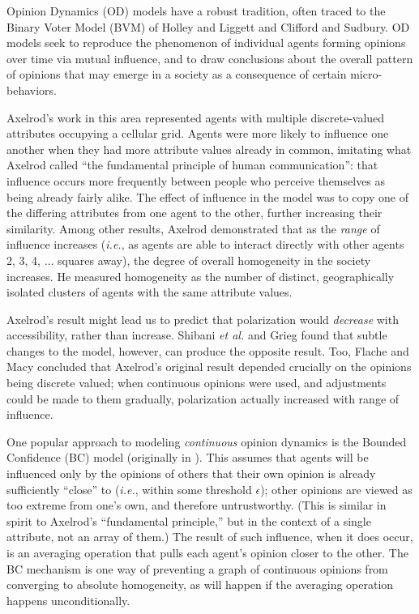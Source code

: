 
\label{sec:related}

Opinion Dynamics (OD) models have a robust tradition, often traced to the
Binary Voter Model (BVM) of Holley and Liggett\cite{holley_ergodic_1975} and
Clifford and Sudbury\cite{clifford_model_1973}. OD models seek to reproduce
the phenomenon of individual agents forming opinions over time via mutual
influence, and to draw conclusions about the overall pattern of opinions that
may emerge in a society as a consequence of certain micro-behaviors.

Axelrod's work in this area\cite{axelrod_dissemination_1997} represented
agents with multiple discrete-valued attributes occupying a cellular grid.
Agents were more likely to influence one another when they had more attribute
values already in common, imitating what Axelrod called ``the fundamental
principle of human communication'': that influence occurs more frequently
between people who perceive themselves as being already fairly alike. The
effect of influence in the model was to copy one of the differing attributes
from one agent to the other, further increasing their similarity. Among other
results, Axelrod demonstrated that as the \textit{range} of influence
increases (\textit{i.e.}, as agents are able to interact directly with other
agents 2, 3, 4, $\dots$ squares away), the degree of overall homogeneity in
the society increases. He measured homogeneity as the number of distinct,
geographically isolated clusters of agents with the same attribute values.

Axelrod's result might lead us to predict that polarization would
\textit{decrease} with accessibility, rather than increase. Shibani \textit{et
al.}\cite{shibanai_effects_2001} and Grieg\cite{greig_end_2002} found that
subtle changes to the model, however, can produce the opposite result. Too,
Flache and Macy\cite{flache_why_2006} concluded that Axelrod's original result
depended crucially on the opinions being discrete valued; when continuous
opinions were used, and adjustments could be made to them gradually,
polarization actually increased with range of influence.

One popular approach to modeling \textit{continuous} opinion dynamics is the
Bounded Confidence (BC) model (originally in
\cite{deffuant_mixing_2000,hegselmann_opinion_2002}). This assumes that agents
will be influenced only by the opinions of others that their own opinion is
already sufficiently ``close'' to (\textit{i.e.}, within some threshold
$\epsilon$); other opinions are viewed as too extreme from one's own, and
therefore untrustworthy. (This is similar in spirit to Axelrod's ``fundamental
principle,'' but in the context of a single attribute, not an array of them.)
The result of such influence, when it does occur, is an averaging operation
that pulls each agent's opinion closer to the other. The BC mechanism is one
way of preventing a graph of continuous opinions from converging to absolute
homogeneity, as will happen if the averaging operation happens
unconditionally.

